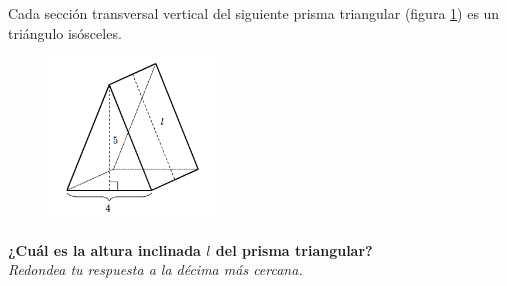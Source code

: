 Cada sección transversal vertical del siguiente prisma triangular (figura \ref{fig:pitagoras3D_pris_02}) es un triángulo isósceles.
\begin{figure}[H]
    \begin{center}
        \includegraphics[width=0.4\textwidth]{../images/pitagoras3D_pris_02.png}
    \end{center}
    \caption{}
    \label{fig:pitagoras3D_pris_02}
\end{figure}
\textbf{¿Cuál es la altura inclinada $l$ del prisma triangular?}\\
\textit{Redondea tu respuesta a la décima más cercana.}